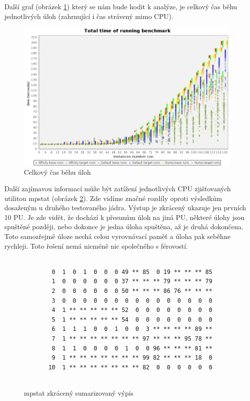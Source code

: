 \documentclass[
  master=true,
  font=sans,
  printversion=false,
  joinlists=true,
  figures=true,
  tables=true,
  sourcecodes=false,
  theorems=false,
  bibencoding=utf8,
  language=czech,
  encoding=utf8,
  field=ainfk,
  biblatex,
  glossaries,
  index
]{kidiplom}
\begin{document}
\newpage
Další graf (obrázek \ref{total time}) který se nám bude hodit k analýze, je celkový čas běhu jednotlivých úloh (zahrnující i čas strávený mimo CPU).

\begin{figure}[ht]
\center
\includegraphics[scale=0.32]{obrazky/totalTime.png}
\caption{Celkový čas běhu úloh}
\label{total time}
\end{figure}

Další zajímavou informací může být zatížení jednotlivých CPU zjišťovaných utilitou mpstat (obrázek \ref{mpstat2}). Zde vidíme značné rozdíly oproti výsledkům dosaženým u druhého testovaného jádra. Výstup je zkrácený ukazuje jen prvních 10 PU. Je zde vidět, že dochází k přesunům úloh na jiná PU, některé úlohy jsou spuštěné později, nebo dokonce je jedna úloha spuštěna, až je druhá dokončena. Toto samozřejmě úloze nechá celou vyrovnávací paměť a úloha pak seběhne rychleji. Toto řešení nemá nicméně nic společného s férovostí. 

\begin{figure}[ht]
\caption{mpstat zkrácený sumarizovaný výpis}
\center
\label{mpstat2}

\begin{Verbatim}[frame=single]

        0  1  0  1  0  0  0 49 ** 85  0 19 ** ** ** 85 
        1  0  0  0  0  0  0 37 ** ** ** 79 ** ** ** 79
        2  0  0  0  0  0  0 50 ** ** ** 86 76 ** ** ** 
        3  0  0  0  0  0  0  0  0  0  0  0  0  0  0  0 
        4  1 ** ** ** ** ** 52  0  0  0  0  0  0  0  0
        5  1 ** ** ** ** ** 54  0  0  0  0  0  0  0  0
        6  1  1  1  0  0  1  0  0  3 ** ** ** ** 89 **
        7  1 ** ** ** ** ** ** ** 97 ** ** ** 95 78 **
        8  1  1  0  0  0  0  1  0  0 96 ** ** ** 81 **
        9  1 ** ** ** ** ** ** ** 99 82 ** ** ** 18  0
       10  1 ** ** ** ** ** ** ** 82  0  0  0  0  0  0
      
\end{Verbatim}
\end{figure}
\newpage
\end{document}
